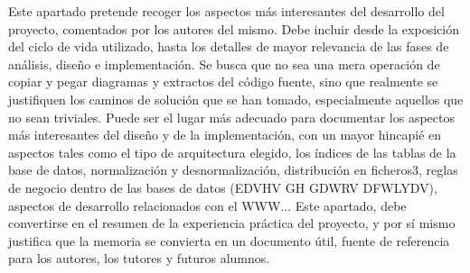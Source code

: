 
Este apartado pretende recoger los aspectos más interesantes del desarrollo del proyecto, comentados por los autores del mismo.
Debe incluir desde la exposición del ciclo de vida utilizado, hasta los detalles de mayor relevancia de las fases de análisis, diseño e implementación.
Se busca que no sea una mera operación de copiar y pegar diagramas y extractos del código fuente, sino que realmente se justifiquen los caminos de solución que se han tomado, especialmente aquellos que no sean triviales.
Puede ser el lugar más adecuado para documentar los aspectos más interesantes del diseño y de la implementación, con un mayor hincapié en aspectos tales como el tipo de arquitectura elegido, los índices de las tablas de la base de datos, normalización y desnormalización, distribución en ficheros3, reglas de negocio dentro de las bases de datos (EDVHV GH GDWRV DFWLYDV), aspectos de desarrollo relacionados con el WWW...
Este apartado, debe convertirse en el resumen de la experiencia práctica del proyecto, y por sí mismo justifica que la memoria se convierta en un documento útil, fuente de referencia para los autores, los tutores y futuros alumnos.

